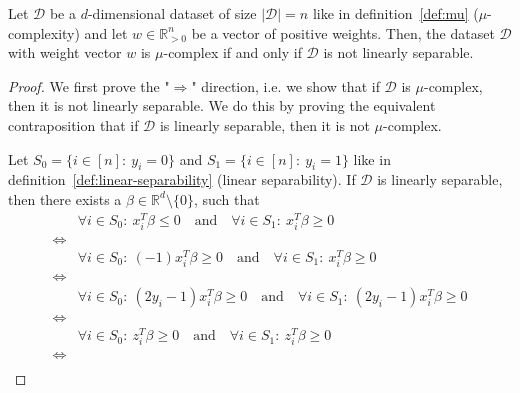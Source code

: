 \begin{theorem}
    \label{theorem:mu-linear-separability}
    Let $\mathcal{D}$ be a $d$-dimensional dataset of size
    $|\mathcal{D}| = n$ like in definition~\ref{def:mu}
    ($\mu$-complexity)
    and let $w \in \mathbb{R}^n_{>0}$ be a vector of
    positive weights.
    Then, the dataset
    $\mathcal{D}$ with weight vector $w$ is $\mu$-complex
    if and only if $\mathcal{D}$ is not linearly separable.
\end{theorem}
\begin{proof}
We first prove the "$\Rightarrow$" direction, i.e. we show
that if $\mathcal{D}$ is $\mu$-complex,
then it is not linearly separable.
We do this by proving the equivalent
contraposition that if $\mathcal{D}$ is linearly separable,
then it is not $\mu$-complex.

Let $S_0 = \{i \in [n]:\ y_i = 0\}$ and $S_1 = \{i \in [n]:\ y_i = 1\}$
like in definition~\ref{def:linear-separability}
(linear separability).
If $\mathcal{D}$ is linearly separable, then there exists
a $\beta \in \mathbb{R}^d \setminus \{0\}$, such that
\begingroup
\allowdisplaybreaks
\begin{align*}
                & \forall i \in S_0:\ x_i^T \beta \leq 0\quad \text{and}\quad \forall i \in S_1:\ x_i^T \beta \geq 0                       \\
    \iff        &                                                                                                                          \\
                & \forall i \in S_0:\ (-1) x_i^T \beta \geq 0\quad \text{and}\quad \forall i \in S_1:\ x_i^T \beta \geq 0                  \\
    \iff        &                                                                                                                          \\
                & \forall i \in S_0:\ (2y_i - 1) x_i^T \beta \geq 0\quad \text{and}\quad \forall i \in S_1:\ (2y_i - 1) x_i^T \beta \geq 0 \\
    \iff        &                                                                                                                          \\
                & \forall i \in S_0:\ z_i^T \beta \geq 0\quad \text{and}\quad \forall i \in S_1:\ z_i^T \beta \geq 0                       \\
    \iff        &                                                                                                                          \\

\end{align*}
\end{proof}
